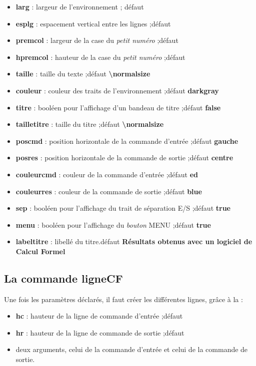 \documentclass{article}
\newcommand\ctex[1]{\tcbox[vignettelatex]{#1}}
\newcommand\Cle[1]{{\bfseries\sffamily\textlangle #1\textrangle}}
\begin{document}
\begin{itemize}
	\item \Cle{larg} : largeur de l'environnement ; \hfill{}défaut \Cle{16}
	\item \Cle{esplg} : espacement vertical entre les lignes ;\hfill{}défaut \Cle{2pt}
	\item \Cle{premcol} : largeur de la case du \textit{petit numéro} ;\hfill{}défaut \Cle{0.3}
	\item \Cle{hpremcol} : hauteur de la case du \textit{petit numéro} ;\hfill{}défaut \Cle{0.4}
	\item \Cle{taille} : taille du texte ;\hfill{}défaut \Cle{\textbackslash normalsize}
	\item \Cle{couleur} : couleur des traits de l'environnement ;\hfill{}défaut \Cle{darkgray}
	\item \Cle{titre} : booléen pour l'affichage d'un bandeau de titre ;\hfill{}défaut \Cle{false}
	\item \Cle{tailletitre} : taille du titre ;\hfill{}défaut \Cle{\textbackslash normalsize}
	\item \Cle{poscmd} : position horizontale de la commande d'entrée ;\hfill{}défaut \Cle{gauche}
	\item \Cle{posres} : position horizontale de la commande de sortie ;\hfill{}défaut \Cle{centre}
	\item \Cle{couleurcmd} : couleur de la commande d'entrée ;\hfill{}défaut \Cle{ed}
	\item \Cle{couleurres} : couleur de la commande de sortie ;\hfill{}défaut \Cle{blue}
	\item \Cle{sep} : booléen pour l'affichage du trait de séparation E/S ;\hfill{}défaut \Cle{true}
	\item \Cle{menu} : booléen pour l'affichage du \textit{bouton} MENU ;\hfill{}défaut \Cle{true}
	\item \Cle{labeltitre} : libellé du titre.\hfill{}défaut \Cle{Résultats obtenus avec un logiciel de Calcul Formel}
\end{itemize}

\subsection{La commande \og ligneCF \fg}

Une fois les paramètres déclarés, il faut créer les différentes lignes, grâce à la \ctex{\textbackslash ligneCF} :

\begin{itemize}
	\item \Cle{hc} : hauteur de la ligne de commande d'entrée ;\hfill{}défaut \Cle{0.75}
	\item \Cle{hr} : hauteur de la ligne de commande de sortie ;\hfill{}défaut \Cle{0.75}
	\item deux \textsf{arguments}, celui de la commande d'entrée et celui de la commande de sortie.
\end{itemize}
\end{document}
